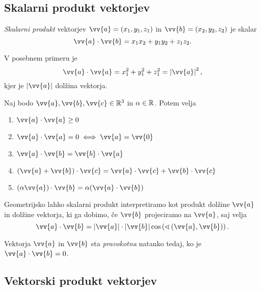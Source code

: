 \documentclass[12pt, a4paper]{article}
\begin{document}
\newpage

\subsection{Skalarni produkt vektorjev}

\begin{okvir}
\begin{definicija}
\emph{Skalarni produkt} vektorjev $\vv{a}=(x_1,y_1,z_1)$ in $\vv{b}=(x_2,y_2,z_2)$
je skalar
\[
\vv{a}\cdot\vv{b}=x_1x_2+y_1y_2+z_1z_2.
\]
\end{definicija}
\end{okvir}

V posebnem primeru je
\[
\vv{a}\cdot\vv{a}=x_1^2+y_1^2+z_1^2=\left|\vv{a}\right|^2,
\]
kjer je $\left|\vv{a}\right|$ dolžina vektorja.

\begin{posledica}
Naj bodo $\vv{a},\vv{b},\vv{c}\in\R^3$ in $\alpha\in\mathbb{R}$. Potem velja

\begin{enumerate}[label=\arabic*)]
\item $\vv{a}\cdot\vv{a}\geq 0$
\item $\vv{a}\cdot\vv{a}=0\iff\vv{a}=\vv{0}$
\item $\vv{a}\cdot\vv{b}=\vv{b}\cdot\vv{a}$
\item $(\vv{a}+\vv{b})\cdot\vv{c}=\vv{a}\cdot\vv{c}+\vv{b}\cdot\vv{c}$
\item $(\alpha\vv{a})\cdot\vv{b}=\alpha(\vv{a}\cdot\vv{b})$
\end{enumerate}
\end{posledica}

Geometrijsko lahko skalarni produkt interpretiramo kot produkt dolžine $\vv{a}$ in dolžine vektorja, ki ga dobimo, če $\vv{b}$ projeciramo na $\vv{a}$, saj velja
\[
\vv{a}\cdot\vv{b}=\left|\vv{a}\right|\cdot\left|\vv{b}\right|\cos\left(\sphericalangle\left(\vv{a},\vv{b}\right)\right).
\]

\begin{definicija}
Vektorja $\vv{a}$ in $\vv{b}$ sta \emph{pravokotna} natanko tedaj, ko je $\vv{a}\cdot\vv{b}=0$.
\end{definicija}

\newpage

\subsection{Vektorski produkt vektorjev}
\end{document}
